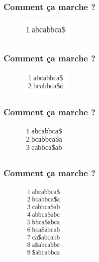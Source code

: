 \documentclass[10pt]{beamer}
\begin{document}
\begin{frame}
  \frametitle{Comment ça marche ?}
  \begin{figure}
    \includegraphics[width=0.22\textwidth]{start_burrows}
  \end{figure}

\end{frame}

\begin{frame}
  \frametitle{Comment ça marche ?}
  \begin{figure}
    \includegraphics[width=0.21\textwidth]{1_burrows}
  \end{figure}

\end{frame}

\begin{frame}
  \frametitle{Comment ça marche ?}
  \begin{figure}
    \includegraphics[width=0.2\textwidth]{2_burrows}
  \end{figure}

\end{frame}

\begin{frame}
  \frametitle{Comment ça marche ?}
  \begin{figure}
    \includegraphics[width=0.2\textwidth]{3_burrows}
  \end{figure}

\end{frame}
\end{document}
